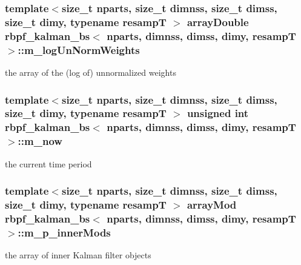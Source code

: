 \subsubsection[{\texorpdfstring{m\+\_\+log\+Un\+Norm\+Weights}{m_logUnNormWeights}}]{\setlength{\rightskip}{0pt plus 5cm}template$<$size\+\_\+t nparts, size\+\_\+t dimnss, size\+\_\+t dimss, size\+\_\+t dimy, typename resampT $>$ {\bf array\+Double} {\bf rbpf\+\_\+kalman\+\_\+bs}$<$ nparts, dimnss, dimss, dimy, resampT $>$\+::m\+\_\+log\+Un\+Norm\+Weights\hspace{0.3cm}{\ttfamily [private]}}\hypertarget{classrbpf__kalman__bs_ab5cfe5ba161d08d86946f783ade20883}{}\label{classrbpf__kalman__bs_ab5cfe5ba161d08d86946f783ade20883}
the array of the (log of) unnormalized weights 
\subsubsection[{\texorpdfstring{m\+\_\+now}{m_now}}]{\setlength{\rightskip}{0pt plus 5cm}template$<$size\+\_\+t nparts, size\+\_\+t dimnss, size\+\_\+t dimss, size\+\_\+t dimy, typename resampT $>$ unsigned int {\bf rbpf\+\_\+kalman\+\_\+bs}$<$ nparts, dimnss, dimss, dimy, resampT $>$\+::m\+\_\+now\hspace{0.3cm}{\ttfamily [private]}}\hypertarget{classrbpf__kalman__bs_abbb78e54b0077e126cb5816ede57b9a0}{}\label{classrbpf__kalman__bs_abbb78e54b0077e126cb5816ede57b9a0}
the current time period 
\subsubsection[{\texorpdfstring{m\+\_\+p\+\_\+inner\+Mods}{m_p_innerMods}}]{\setlength{\rightskip}{0pt plus 5cm}template$<$size\+\_\+t nparts, size\+\_\+t dimnss, size\+\_\+t dimss, size\+\_\+t dimy, typename resampT $>$ {\bf array\+Mod} {\bf rbpf\+\_\+kalman\+\_\+bs}$<$ nparts, dimnss, dimss, dimy, resampT $>$\+::m\+\_\+p\+\_\+inner\+Mods\hspace{0.3cm}{\ttfamily [private]}}\hypertarget{classrbpf__kalman__bs_a5476616a6294961cacb9aa82bcf5cfd6}{}\label{classrbpf__kalman__bs_a5476616a6294961cacb9aa82bcf5cfd6}
the array of inner Kalman filter objects 
